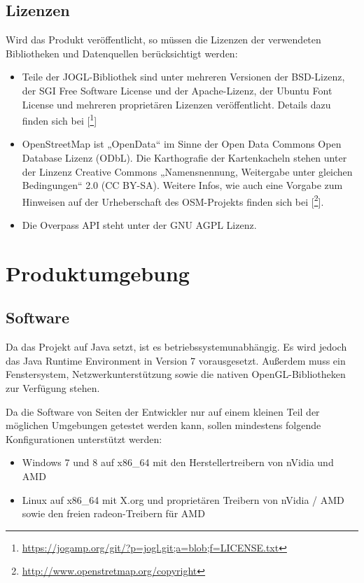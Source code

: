 \documentclass[10pt]{scrreprt}
\begin{document}
\section{Lizenzen}
Wird das Produkt veröffentlicht, so müssen die Lizenzen der verwendeten Bibliotheken und Datenquellen berücksichtigt werden:
\begin{itemize}
\item Teile der JOGL-Bibliothek sind unter mehreren Versionen der BSD-Lizenz, der SGI Free Software License und der Apache-Lizenz, der Ubuntu Font License und mehreren proprietären Lizenzen veröffentlicht. Details dazu finden sich bei [\footnote{\url{https://jogamp.org/git/?p=jogl.git;a=blob;f=LICENSE.txt}}]
\item OpenStreetMap ist „OpenData“ im Sinne der Open Data Commons Open Database Lizenz (ODbL). Die Karthografie der Kartenkacheln stehen unter der Linzenz  Creative Commons „Namensnennung, Weitergabe unter gleichen Bedingungen“ 2.0 (CC BY-SA). Weitere Infos, wie auch eine Vorgabe zum Hinweisen auf der Urheberschaft des OSM-Projekts finden sich bei [\footnote{\url{http://www.openstretmap.org/copyright}}].
\item Die Overpass API steht unter der GNU AGPL Lizenz.
\end{itemize}




\chapter{Produktumgebung}
\section{Software}
Da das Projekt auf Java setzt, ist es betriebssystemunabhängig. Es wird jedoch das Java Runtime Environment in Version 7 vorausgesetzt. Außerdem muss ein Fenstersystem, Netzwerkunterstützung sowie die nativen OpenGL-Bibliotheken zur Verfügung stehen.

Da die Software von Seiten der Entwickler nur auf einem kleinen Teil der möglichen Umgebungen getestet werden kann, sollen mindestens folgende Konfigurationen unterstützt werden:
\begin{itemize}
\item Windows 7 und 8 auf x86{\_}64 mit den Herstellertreibern von nVidia und AMD
\item Linux auf x86{\_}64 mit X.org und proprietären Treibern von nVidia / AMD sowie den freien radeon-Treibern für AMD
\end{itemize}
\end{document}
